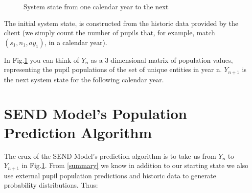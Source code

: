 \documentclass[margin=5mm]{article}
\begin{document}
\begin{figure}[h!]
  \caption{System state from one calendar year to the next\label{state}
  }
\end{figure}

The initial system state, is constructed from the historic data
provided by the client (we simply count the number of pupils that, for
example, match $(s_1,n_1,ay_1)$, in a calendar year).

In Fig.\ref{state} you can think of $Y_n$ as a 3-dimensional matrix of
population values, representing the pupil populations of the set of
unique entities in year n.  $Y_{n+1}$ is the next system state for the
following calendar year.

\section{SEND Model's Population Prediction Algorithm}

The crux of the SEND Model's prediction algorithm is to take us from
$Y_n$ to $Y_{n+1}$ in Fig.\ref{state}. From \ref{summary} we know in
addition to our starting state we also use external pupil population
predictions and historic data to generate probability distributions.
Thus:
\end{document}
